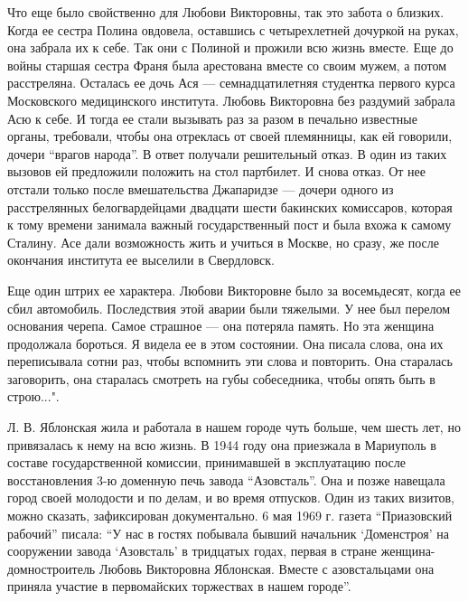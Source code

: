 Что еще было свойственно для Любови Викторовны, так это забота о близких. Когда
ее сестра Полина овдовела, оставшись с четырехлетней дочуркой на руках, она
забрала их к себе. Так они с Полиной и прожили всю жизнь вместе. Еще до войны
старшая сестра Франя была арестована вместе со своим мужем, а потом
расстреляна. Осталась ее дочь Ася — семнадцатилетняя студентка первого курса
Московского медицинского института. Любовь Викторовна без раздумий забрала Асю
к себе. И тогда ее стали вызывать раз за разом в печально известные органы,
требовали, чтобы она отреклась от своей племянницы, как ей говорили, дочери
\enquote{врагов народа}. В ответ получали решительный отказ. В один из таких вызовов ей
предложили положить на стол партбилет. И снова отказ. От нее отстали только
после вмешательства Джапаридзе — дочери одного из расстрелянных белогвардейцами
двадцати шести бакинских комиссаров, которая к тому времени занимала важный
государственный пост и была вхожа к самому Сталину. Асе дали возможность жить и
учиться в Москве, но сразу, же после окончания института ее выселили в
Свердловск.

Еще один штрих ее характера. Любови Викторовне было за восемьдесят, когда ее
сбил автомобиль. Последствия этой аварии были тяжелыми. У нее был перелом
основания черепа. Самое страшное — она потеряла память. Но эта женщина
продолжала бороться. Я видела ее в этом состоянии. Она писала слова, она их
переписывала сотни раз, чтобы вспомнить эти слова и повторить. Она старалась
заговорить, она старалась смотреть на губы собеседника, чтобы опять быть в
строю...".

Л. В. Яблонская жила и работала в нашем городе чуть больше, чем шесть лет, но
привязалась к нему на всю жизнь. В 1944 году она приезжала в Мариуполь в
составе государственной комиссии, принимавшей в эксплуатацию после
восстановления 3-ю доменную печь завода \enquote{Азовсталь}. Она и позже навещала город
своей молодости и по делам, и во время отпусков. Один из таких визитов, можно
сказать, зафиксирован документально. 6 мая 1969 г. газета \enquote{Приазовский рабочий}
писала: \enquote{У нас в гостях побывала бывший начальник \enquote{Доменстроя} на сооружении
завода \enquote{Азовсталь} в тридцатых годах, первая в стране женщина-домностроитель
Любовь Викторовна Яблонская. Вместе с азовстальцами она приняла участие в
первомайских торжествах в нашем городе}.

